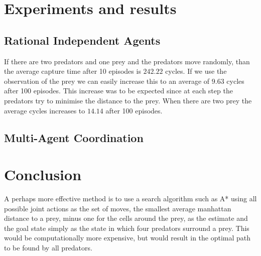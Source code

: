 \documentclass[10pt]{article}
\begin{document}
\section{Experiments and results}\label{experiments}
\subsection{Rational Independent Agents}
If there are two predators and one prey and the predators move randomly, than the average capture time after 10 episodes is $242.22$ cycles. If we use the observation of the prey we can easily increase this to an average of $9.63$ cycles after 100 episodes. This increase was to be expected since at each step the predators try to minimise the distance to the prey. When there are two prey the average cycles increases to $14.14$ after 100 episodes. 


\subsection{Multi-Agent Coordination}

\section{Conclusion}\label{conclusion}
%



A perhaps more effective method is to use a search algorithm such as A* using all possible joint actions as the set of moves, the smallest average manhattan distance to a prey, minus one for the cells around the prey, as the estimate and the goal state simply as the state in which four predators surround a prey. This would be computationally more expensive, but would result in the optimal path to be found by all predators.



 \pagebreak

  
 
 \pagebreak
 \appendix
\end{document}
